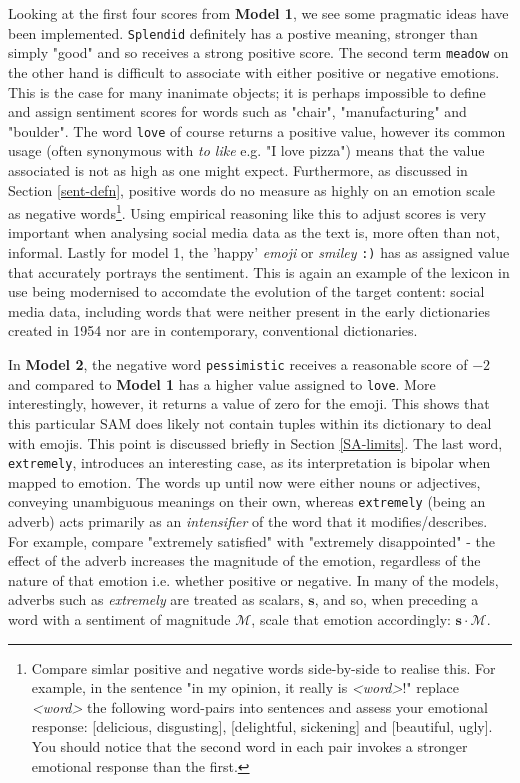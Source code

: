 \documentclass{article}
\begin{document}
\vspace{3mm}

Looking at the first four scores from \textbf{Model 1}, we see some pragmatic ideas have been implemented. \texttt{Splendid} definitely has a postive meaning, stronger than simply "good" and so receives a strong positive score. The second term \texttt{meadow} on the other hand is difficult to associate with either positive or negative emotions. This is the case for many inanimate objects; it is perhaps impossible to define and assign sentiment scores for words such as "chair", "manufacturing" and "boulder". The word \texttt{love} of course returns a positive value, however its common usage (often synonymous with \emph{to like} e.g. "I love pizza") means that the value associated is not as high as one might expect. Furthermore, as discussed in Section \ref{sent-defn}, positive words do no measure as highly on an emotion scale as negative words\footnote{Compare simlar positive and negative words side-by-side to realise this. For example, in the sentence "in my opinion, it really is \emph{<word>}!" replace \emph{<word>} the following word-pairs into sentences and assess your emotional response: [delicious, disgusting], [delightful, sickening] and [beautiful, ugly]. You should notice that the second word in each pair invokes a stronger emotional response than the first.}.
Using empirical reasoning like this to adjust scores is very important when analysing social media data as the text is, more often than not, informal. Lastly for model 1, the 'happy' \emph{emoji} or \emph{smiley} \texttt{:)} has as assigned value that accurately portrays the sentiment. This is again an example of the lexicon in use being modernised to accomdate the evolution of the target content: social media data, including words that were neither present in the early dictionaries created in 1954 nor are in contemporary, conventional dictionaries.

In \textbf{Model 2}, the negative word \texttt{pessimistic} receives a reasonable score of $-2$ and compared to \textbf{Model 1} has a higher value assigned to \texttt{love}. More interestingly, however, it returns a value of zero for the emoji. This shows that this particular SAM does likely not contain tuples within its dictionary to deal with emojis. This point is discussed briefly in Section \ref{SA-limits}. The last word, \texttt{extremely}, introduces an interesting case, as its interpretation is bipolar when mapped to emotion. The words up until now were either nouns or adjectives, conveying unambiguous meanings on their own, whereas \texttt{extremely} (being an adverb) acts primarily as an \emph{intensifier} of the word that it modifies/describes. For example, compare "extremely satisfied" with "extremely disappointed" - the effect of the adverb increases the magnitude of the emotion, regardless of the nature of that emotion i.e. whether positive or negative. In many of the models, adverbs such as \emph{extremely} are treated as scalars, $\mathbf{s}$, and so, when preceding a word with a sentiment of magnitude $\mathcal{M}$, scale that emotion accordingly: $\mathbf{s \cdot \mathcal{M}}$.
\end{document}
